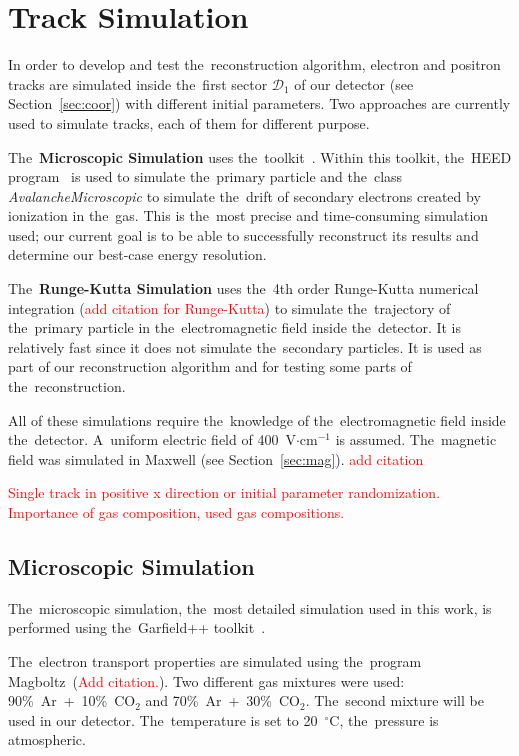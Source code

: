 \chapter{Track Simulation}
	In order to develop and test the~reconstruction algorithm, electron and positron tracks are simulated inside the~first sector $\mathcal{D}_1$ of our detector (see Section~\ref{sec:coor}) with different initial parameters. Two approaches are currently used to simulate tracks, each of them for different purpose.
	
	The~\textbf{Microscopic Simulation} uses the~\garfieldpp toolkit~\cite{Garfield++}. Within this toolkit, the~\ac{HEED} program~\cite{HEED} is used to simulate the~primary particle and the~class \textit{AvalancheMicroscopic} to simulate the~drift of secondary electrons created by ionization in the~gas. This is the~most precise and time-consuming simulation used; our current goal is to be able to successfully reconstruct its results and determine our best-case energy resolution.
	
	The~\textbf{Runge-Kutta Simulation} uses the~4th order Runge-Kutta numerical integration (\textcolor{red}{add citation for Runge-Kutta}) to simulate the~trajectory of the~primary particle in the~electromagnetic field inside the~detector. It is relatively fast since it does not simulate the~secondary particles. It is used as part of our reconstruction algorithm and for testing some parts of the~reconstruction.
	
	All of these simulations require the~knowledge of the~electromagnetic field inside the~detector. A~uniform electric field of 400~V$\cdot$cm$^{-1}$ is assumed. The~magnetic field was simulated in Maxwell (see Section~\ref{sec:mag}). \textcolor{red}{add citation}
	
	\textcolor{red}{Single track in positive x direction or initial parameter randomization. Importance of gas composition, used gas compositions.}
	
	\section{Microscopic Simulation}
	\label{sec:microsim}
		The~microscopic simulation, the~most detailed simulation used in this work, is performed using the~Garfield++ toolkit~\cite{Garfield++}.
		
		The~electron transport properties are simulated using the~program Magboltz~(\textcolor{red}{Add citation.}). Two different gas mixtures were used: 90\%~Ar~+~10\%~CO$_2$ and 70\%~Ar~+~30\%~CO$_2$. The~second mixture will be used in our detector. The~temperature is set to 20~$^\circ$C, the~pressure is atmospheric.
		
